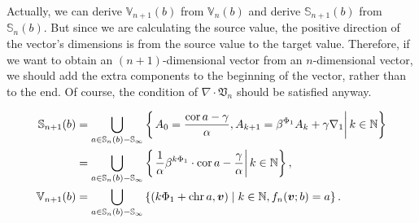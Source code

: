 Actually, we can derive $\mathbb{V}_{n+1}(b)$ from $\mathbb{V}_{n}(b)$ and derive $\mathbb{S}_{n+1}(b)$ from $\mathbb{S}_{n}(b)$.
But since we are calculating the source value, the positive direction of the vector's dimensions is from the source value to the target value.
Therefore, if we want to obtain an $(n+1)$-dimensional vector from an $n$-dimensional vector, we should add the extra components to the beginning of the vector, rather than to the end.
Of course, the condition of $\nabla\cdot\mathfrak{V}_{n}$ should be satisfied anyway.
\begin{theorem}\label{thm:layers-of-reduce-space-and-source-value-set}
    \begin{align*}
        \mathbb{S}_{n+1}(b) &= \bigcup_{a\in \mathbb{S}_{n}(b) - \mathbb{S}_{\infty}} \left\{\left. A_0 = \frac{\operatorname{cor} a  - \gamma}{\alpha}, A_{k+1} = \beta^{\Phi_1} A_{k} + \gamma\nabla_1 \right\vert k\in\mathbb{N}\right\} \\
        &= \bigcup_{a\in \mathbb{S}_{n}(b) - \mathbb{S}_{\infty}} \left\{\left.\frac{1}{\alpha}\beta^{k\Phi_1}\cdot\operatorname{cor} a - \frac{\gamma}{\alpha}\right\vert k\in \mathbb{N}\right\},\\
        \mathbb{V}_{n+1}(b) &= \bigcup_{a\in \mathbb{S}_{n}(b) - \mathbb{S}_{\infty}} \left\{ (k\Phi_1 +  \operatorname{chr} a, \bm{v}) \mid  k\in \mathbb{N}, f_{n}(\bm{v};b) = a\right\}.
    \end{align*}
\end{theorem}
